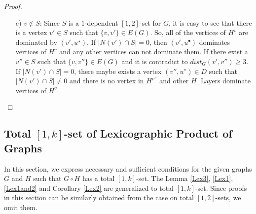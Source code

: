 \documentclass[A4,12pt]{article}
\theoremstyle{definition}
\theoremstyle{remark}
\begin{document}
\begin{proof}
\begin{enumerate}
\begin{enumerate}
\\
\item [c)] $v \notin S$: Since $S$ is a $1$-dependent $[1,2]$-set for $G$, it is easy to see that  there is a vertex $v' \in S$ such that $\{v,v' \}\in E(G)$. So, all of the vertices of $H^v$ are dominated by $(v',u^{\star})$. If $\vert  N(v')\cap S\vert  =0$, then $(v',u^{\bullet})$ dominates vertices of $H^v$ and any other vertices can not dominate them. If there exist a $v'' \in S$ such that $\{v,v''\} \in E(G)$ and it is contradict to $dist_G(v',v'') \geq 3$. If $\vert  N(v')\cap S\vert  =0$, there maybe exists a vertex $(v'',u^{\star}) \in D$ such that  $\vert  N(v')\cap S\vert  \neq 0$ and there is no vertex in $H^{v''}$ and other $H_{-}$Layers dominate vertices of $H^v$.
\end{enumerate}

\end{enumerate}

\end{proof}
\subsection{Total $[1,k]$-set of Lexicographic Product of Graphs}
In this section, we express necessary and sufficient conditions for the given graphs $G$ and $H$ such that $G \circ H$ has a total  $[1,k]$-set. The Lemma \ref{Lex3}, \ref{Lex1}, \ref{Lex1and2} and Corollary \ref{Lex2} are generalized to total $[1,k]$-set. Since proofs in this section can be similarly obtained from the case on total $[1,2]$-sets, we omit them.
\end{document}
